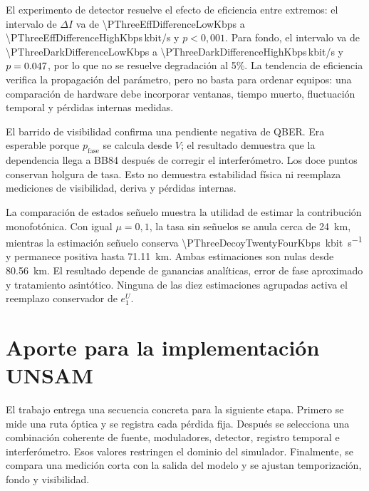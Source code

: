 El experimento de detector resuelve el efecto de eficiencia entre extremos: el intervalo de \(\Delta I\) va de \num[round-mode=places,round-precision=1]{\PThreeEffDifferenceLowKbps} a \num[round-mode=places,round-precision=1]{\PThreeEffDifferenceHighKbps}\,kbit/s y \(p<0{,}001\). Para fondo, el intervalo va de \num[round-mode=places,round-precision=1]{\PThreeDarkDifferenceLowKbps} a \num[round-mode=places,round-precision=1]{\PThreeDarkDifferenceHighKbps}\,kbit/s y \(p=\num[round-mode=places,round-precision=3]{\PThreeDarkPValue}\), por lo que no se resuelve degradación al 5\%. La tendencia de eficiencia verifica la propagación del parámetro, pero no basta para ordenar equipos: una comparación de hardware debe incorporar ventanas, tiempo muerto, fluctuación temporal y pérdidas internas medidas.

El barrido de visibilidad confirma una pendiente negativa de QBER. Era esperable porque \(p_\mathrm{fase}\) se calcula desde \(V\); el resultado demuestra que la dependencia llega a BB84 después de corregir el interferómetro. Los doce puntos conservan holgura de tasa. Esto no demuestra estabilidad física ni reemplaza mediciones de visibilidad, deriva y pérdidas internas.

La comparación de estados señuelo muestra la utilidad de estimar la contribución monofotónica. Con igual \(\mu=0{,}1\), la tasa sin señuelos se anula cerca de \SI{24}{\kilo\meter}, mientras la estimación señuelo conserva \SI[round-mode=places,round-precision=1]{\PThreeDecoyTwentyFourKbps}{\kilo bit\per\second} y permanece positiva hasta \SI{71.11}{\kilo\meter}. Ambas estimaciones son nulas desde \SI{80.56}{\kilo\meter}. El resultado depende de ganancias analíticas, error de fase aproximado y tratamiento asintótico. Ninguna de las diez estimaciones agrupadas activa el reemplazo conservador de \(e_1^U\).

\section{Aporte para la implementación UNSAM}

El trabajo entrega una secuencia concreta para la siguiente etapa. Primero se mide una ruta óptica y se registra cada pérdida fija. Después se selecciona una combinación coherente de fuente, moduladores, detector, registro temporal e interferómetro. Esos valores restringen el dominio del simulador. Finalmente, se compara una medición corta con la salida del modelo y se ajustan temporización, fondo y visibilidad.

